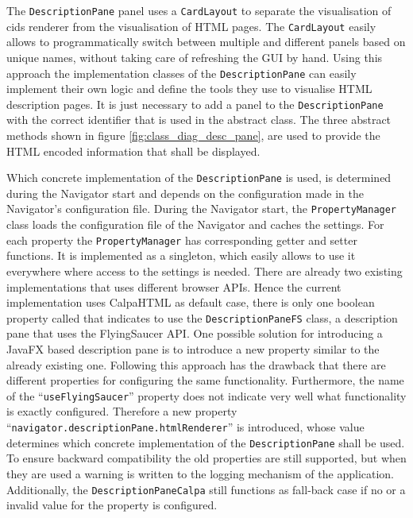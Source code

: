 The \texttt{DescriptionPane} panel uses a \texttt{CardLayout} to separate the visualisation of cids renderer from the visualisation of HTML pages.
The \texttt{CardLayout} easily allows to programmatically switch between multiple and different panels based on unique names, without taking care of refreshing the GUI by hand.
Using this approach the implementation classes of the \texttt{DescriptionPane} can easily implement their own logic and define the tools they use to visualise HTML description pages.
It is just necessary to add a panel to the \texttt{DescriptionPane} with the correct identifier that is used in the abstract class.
The three abstract methods shown in figure \ref{fig:class_diag_desc_pane}, are used to provide the HTML encoded information that shall be displayed.

Which concrete implementation of the \texttt{DescriptionPane} is used, is determined during the Navigator start and depends on the configuration made in the Navigator's configuration file.
During the Navigator start, the \texttt{PropertyManager} class loads the configuration file of the Navigator and caches the settings.
For each property the \texttt{PropertyManager} has corresponding getter and setter functions.
It is implemented as a singleton, which easily allows to use it everywhere where access to the settings is needed.
There are already two existing implementations that uses different browser APIs.
Hence the current implementation uses CalpaHTML as default case, there is only one boolean property called  that indicates to use the \texttt{DescriptionPaneFS} class, a description pane that uses the FlyingSaucer API.
One possible solution for introducing a JavaFX based description pane is to introduce a new property similar to the already existing one.
Following this approach has the drawback that there are different properties for configuring the same functionality.
Furthermore, the name of the \enquote{\texttt{useFlyingSaucer}} property does not indicate very well what functionality is exactly configured.
Therefore a new property \enquote{\texttt{navigator.descriptionPane.htmlRenderer}} is introduced, whose value determines which concrete implementation of the \texttt{DescriptionPane} shall be used.
To ensure backward compatibility the old properties are still supported, but when they are used a warning is written to the logging mechanism of the application.
Additionally, the \texttt{DescriptionPaneCalpa} still functions as fall-back case if no or a invalid value for the property is configured.

